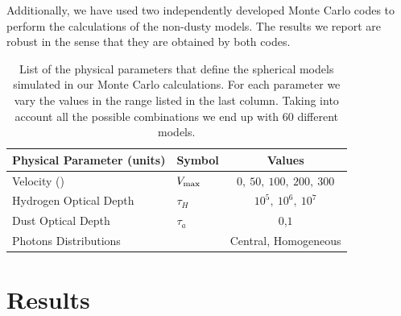 \documentclass{emulateapj}
\newcommand{\kms}{{\ifmmode{{\mathrm{\,km\ s}^{-1}}}\else{\,km~s$^{-1}$}\fi}}
\begin{document}
Additionally, we have used two independently developed Monte Carlo
codes \citep{CLARA,DijkstraKramer} to perform the calculations of the
non-dusty models. The results we report are robust in the sense
that they are obtained by both codes. 

\begin{table}
\begin{center}
\begin{tabular}{llc}\hline\hline
Physical Parameter (units) & Symbol & Values\\\hline
Velocity (\kms) & $V_{\rm max}$&$0,\ 50,\ 100,\ 200,\ 300$\\
Hydrogen Optical Depth & $\tau_{H} $ & $10^{5},\ 10^{6},\ 10^{7}$\\
Dust Optical Depth & $\tau_{a}$ & $0$,$1$\\
Photons Distributions & & Central, Homogeneous\\\hline\hline
\end{tabular}
\caption{
  List of the physical parameters that define the spherical models 
  simulated in our Monte Carlo calculations. For each parameter we
  vary the values in the range listed in the last column. Taking into
  account all the possible combinations we end up with $60$ different
  models.} 
\label{table:models}
\end{center}
\end{table}


\section{Results}
\label{sec:results}
\end{document}

